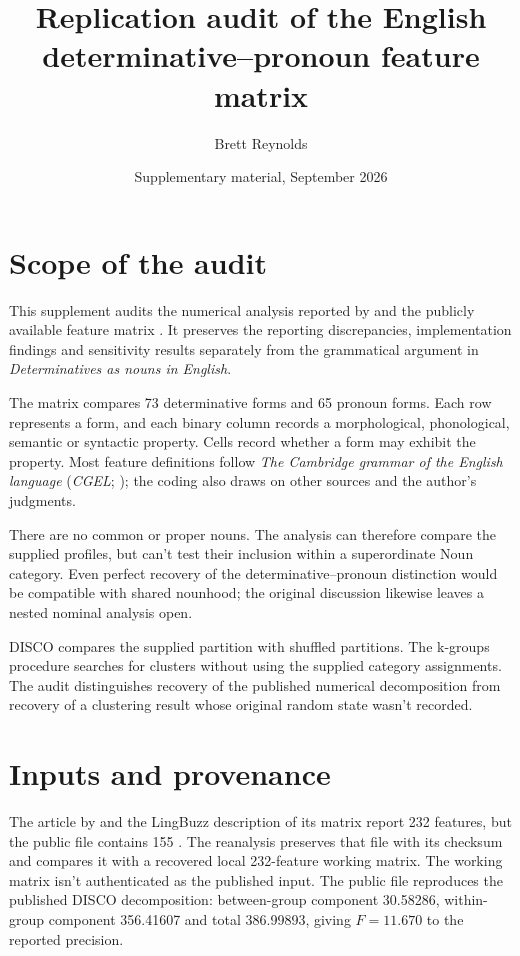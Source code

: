 \documentclass[12pt]{article}
\title{Replication audit of the English determinative--pronoun feature matrix}
\author{Brett Reynolds}
\date{Supplementary material, September 2026}
\begin{document}
\maketitle

\section{Scope of the audit}

This supplement audits the numerical analysis reported by \textcite{reynolds2021} and the publicly available feature matrix \citep{reynolds2021matrixpublic}. It preserves the reporting discrepancies, implementation findings and sensitivity results separately from the grammatical argument in \textit{Determinatives as nouns in English}.

The matrix compares 73 determinative forms and 65 pronoun forms. Each row represents a form, and each binary column records a morphological, phonological, semantic or syntactic property. Cells record whether a form may exhibit the property. Most feature definitions follow \textit{The Cambridge grammar of the English language} (\textit{CGEL}; \citealt{huddleston2002}); the coding also draws on other sources and the author's judgments.

There are no common or proper nouns. The analysis can therefore compare the supplied profiles, but can't test their inclusion within a superordinate Noun category. Even perfect recovery of the determinative--pronoun distinction would be compatible with shared nounhood; the original discussion likewise leaves a nested nominal analysis open.

DISCO compares the supplied partition with shuffled partitions. The k-groups procedure searches for clusters without using the supplied category assignments. The audit distinguishes recovery of the published numerical decomposition from recovery of a clustering result whose original random state wasn't recorded.

\section{Inputs and provenance}

The article by \textcite{reynolds2021} and the LingBuzz description of its matrix report 232 features, but the public file contains 155 \citep{reynolds2021matrixpublic}. The reanalysis preserves that file with its checksum and compares it with a recovered local 232-feature working matrix. The working matrix isn't authenticated as the published input. The public file reproduces the published DISCO decomposition: between-group component 30.58286, within-group component 356.41607 and total 386.99893, giving $F=11.670$ to the reported precision.
\end{document}
